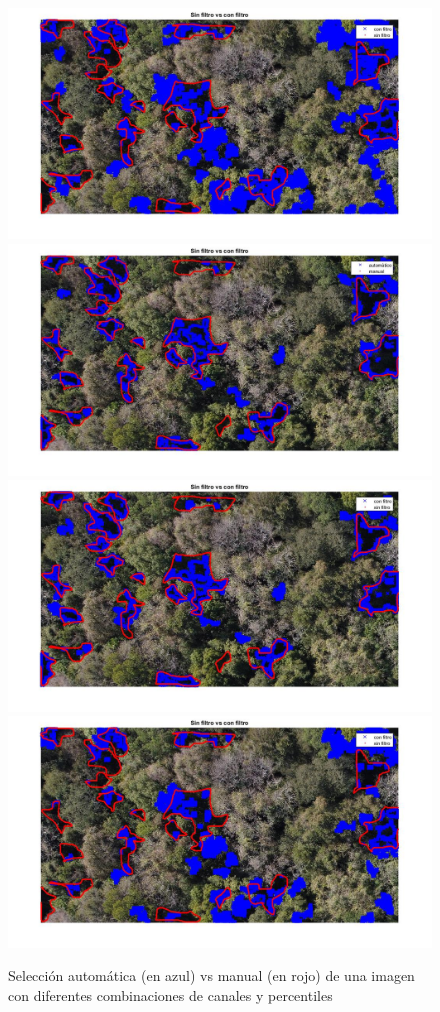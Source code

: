 \begin{figure}
    \includegraphics[width=.3\textwidth]{Imagenes/IIC/p85/GR/310a.jpg}\hfill
    \\[\smallskipamount]
    \includegraphics[width=.3\textwidth]{Imagenes/IIC/p90/BR/310a.jpg}\hfill
    \includegraphics[width=.3\textwidth]{Imagenes/IIC/p90/BG/310a.jpg}\hfill
    \includegraphics[width=.3\textwidth]{Imagenes/IIC/p90/GR/310a.jpg}\hfill
    
    \caption{Selección automática (en azul) vs manual (en rojo) de una imagen con diferentes combinaciones de canales y percentiles}
\end{figure}\label{dji310}

